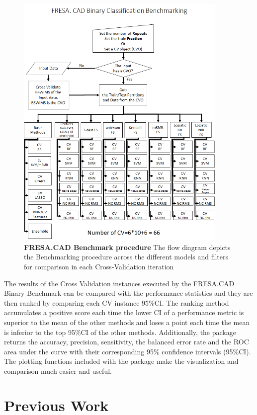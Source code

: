 \begin{figure}[!ht]
	\centerline{\includegraphics[width=4in]{images/background/FresaBinBen.png}}
	\caption{{\bf FRESA.CAD Benchmark procedure\cite{fresa}} The flow diagram depicts the Benchmarking procedure across the different models and filters for comparison in each Cross-Validation iteration}
	\label{fresafig2}
\end{figure}

The results of the Cross Validation instances executed by the FRESA.CAD Binary Benchmark can be compared with the performance statistics and they are then ranked by comparing each CV instance 95\%CI. The ranking method accumulates a positive score each time the lower CI of a performance metric is superior to the mean of the other methods and loses a point each time the mean is inferior to the top 95\%CI of the other methods. Additionally, the package returns the accuracy, precision, sensitivity, the balanced error rate and the ROC area under the curve with their corresponding 95\% confidence intervals (95\%CI). The plotting functions included with the package make the visualization and comparison much easier and useful.

\clearpage

\section{Previous Work}

